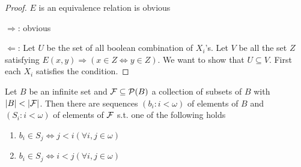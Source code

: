 \documentclass[11pt]{article}
\begin{document}
\begin{proof}
\(E\) is an equivalence relation is obvious

\(\Rightarrow\): obvious

\(\Leftarrow\): Let \(U\) be the set of all boolean combination of \(X_i\)'s. Let \(V\) be all the set \(Z\)
satisfying \(E(x,y)\Rightarrow(x\in Z\Leftrightarrow y\in Z)\). We want to show that \(U\subseteq V\). First each \(X_i\) satisfies
the condition.
\end{proof}

\begin{theorem}
\label{C2.2.11}
Let \(B\) be an infinite set and \(\mathcal{F}\subseteq\mathcal{P}(B)\) a collection of subsets of \(B\)
with \(\abs{B}<\abs{\calf}\). Then there are sequences \((b_i:i<\omega)\) of elements of \(B\)
and \((S_i:i<\omega)\) of elements of \(\mathcal{F}\) s.t. one of the following holds
\begin{enumerate}
\item \(b_i\in S_j\Leftrightarrow j<i(\forall i,j\in\omega)\)
\item \(b_i\in S_j\Leftrightarrow i<j(\forall i,j\in\omega)\)
\end{enumerate}
\end{theorem}
\end{document}
